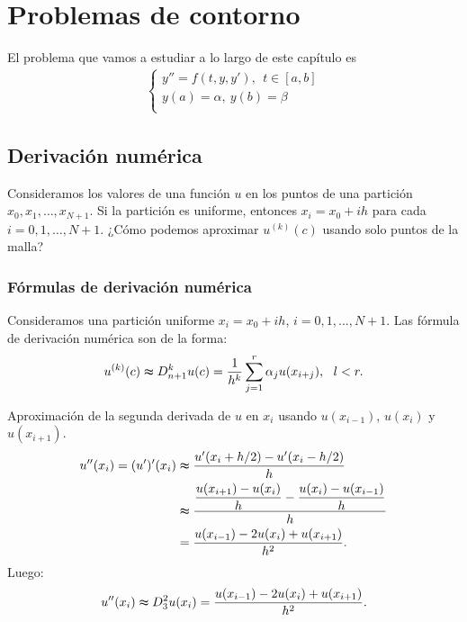 \chapter{Problemas de contorno}
El problema que vamos a estudiar a lo largo de este capítulo es
\begin{align*}
    \left\{ \begin{array}{lcc}
                y'' = f(t,y,y'), \ \ t \in [a,b] \\
                y(a) = \alpha, \ y(b) = \beta    \\
            \end{array}
    \right.
\end{align*}

\section{Derivación numérica}

Consideramos los valores de una función $u$ en los puntos de una partición $x_0,x_1,\ldots,x_{N+1}$. Si la partición es uniforme, entonces $x_i = x_0 + ih$ para cada $i = 0,1,\ldots,N+1$. ¿Cómo podemos aproximar $u^{(k)}(c)$ usando solo puntos de la malla?

\subsection{Fórmulas de derivación numérica}
Consideramos una partición uniforme $x_i = x_0 + ih$, $i = 0,1,\ldots,N+1$. Las fórmula de derivación numérica son de la forma:
\begin{align*}
    u^{(k)}(c) \thickapprox D^k_{n+1}u(c) = \frac{1}{h^k} \sum_{j=1}^{r} \alpha_j u(x_{i+j}), \ \ l < r.
\end{align*}

\begin{ejemplo}
    Aproximación de la segunda derivada de $u$ en $x_i$ usando $u(x_{i-1})$, $u(x_i)$ y $u(x_{i+1})$.
    \begin{align*}
        u''(x_i) = (u')'(x_i) & \thickapprox \frac{u'(x_i + h/2) - u'(x_i -h/2)}{h}                                    \\
                              & \thickapprox \frac{\dfrac{u(x_{i+1}) - u(x_i)}{h} - \dfrac{u(x_i) - u(x_{i-1})}{h}}{h} \\
                              & = \frac{u(x_{i-1}) - 2u(x_i) +u(x_{i+1})}{h^2}.
    \end{align*}
    Luego:
    \begin{align*}
        u''(x_i) \thickapprox D^2_3u(x_i) = \frac{u(x_{i-1}) - 2u(x_i) +u(x_{i+1})}{h^2}.
    \end{align*}
\end{ejemplo}

